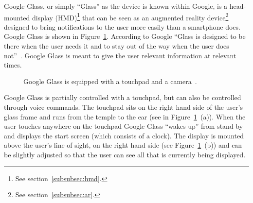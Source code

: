 Google Glass, or simply ``Glass'' as the device is known within Google, is a head-mounted display (HMD)\footnote{See section~\ref{subsubsec:hmd}.} that can be seen as an augmented reality device\footnote{See section~\ref{subsubsec:ar}.} designed to bring notifications to the user more easily than a smartphone does. Google Glass is shown in Figure~\ref{GoogleGlassHardware}. According to Google ``Glass is designed to be there when the user needs it and to stay out of the way when the user does not''~\cite{glassDesignPrinciples}. Google Glass is meant to give the user relevant information at relevant times.

	\begin{figure}[ht!]
		\centering
    \qquad
    \qquad
		\caption{Google Glass is equipped with a touchpad and a camera~\cite{ImagesGoogleGlassUI}.}
		\label{GoogleGlassHardware}
	\end{figure}

Google Glass is partially controlled with a touchpad, but can also be controlled through voice commands. The touchpad sits on the right hand side of the user's glass frame and runs from the temple to the ear (see in Figure~\ref{GoogleGlassHardware}~(a)). When the user touches anywhere on the touchpad Google Glass ``wakes up'' from stand by and displays the start screen (which consists of a clock). The display is mounted above the user's line of sight, on the right hand side (see Figure~\ref{GoogleGlassHardware}~(b)) and can be slightly adjusted so that the user can see all that is currently being displayed.

